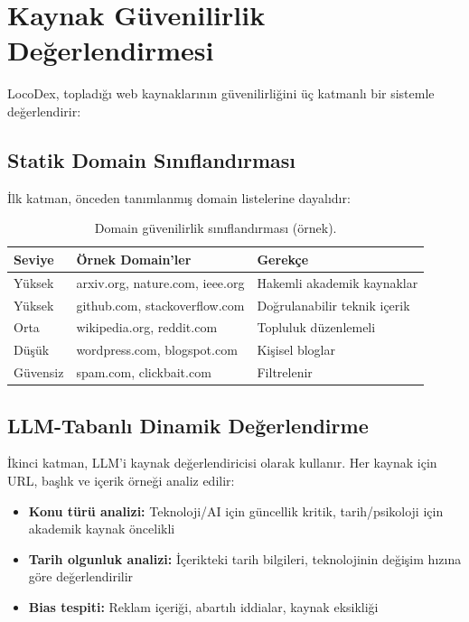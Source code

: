 \section{Kaynak G\"{u}venilirlik De\u{g}erlendirmesi}
\label{sec:source-reliability}

LocoDex, toplad{\i}\u{g}{\i} web kaynaklar{\i}n{\i}n g\"{u}venilirli\u{g}ini \"{u}\c{c} katmanl{\i} bir sistemle de\u{g}erlendirir:

\subsection{Statik Domain S{\i}n{\i}fland{\i}rmas{\i}}

\.{I}lk katman, \"{o}nceden tan{\i}mlanm{\i}\c{s} domain listelerine dayal{\i}d{\i}r:

\begin{table}[H]
\centering
\caption{Domain g\"{u}venilirlik s{\i}n{\i}fland{\i}rmas{\i} (\"{o}rnek).}
\label{tab:domain-reliability}
\begin{tabular}{lll}
\toprule
\textbf{Seviye} & \textbf{\"{O}rnek Domain'ler} & \textbf{Gerek\c{c}e} \\
\midrule
Y\"{u}ksek & arxiv.org, nature.com, ieee.org & Hakemli akademik kaynaklar \\
Y\"{u}ksek & github.com, stackoverflow.com & Do\u{g}rulanabilir teknik i\c{c}erik \\
Orta & wikipedia.org, reddit.com & Topluluk d\"{u}zenlemeli \\
D\"{u}\c{s}\"{u}k & wordpress.com, blogspot.com & Ki\c{s}isel bloglar \\
G\"{u}vensiz & spam.com, clickbait.com & Filtrelenir \\
\bottomrule
\end{tabular}
\end{table}

\subsection{LLM-Tabanl{\i} Dinamik De\u{g}erlendirme}

\.{I}kinci katman, LLM'i kaynak de\u{g}erlendiricisi olarak kullan{\i}r. Her kaynak i\c{c}in URL, ba\c{s}l{\i}k ve i\c{c}erik \"{o}rne\u{g}i analiz edilir:

\begin{itemize}
  \item \textbf{Konu t\"{u}r\"{u} analizi:} Teknoloji/AI i\c{c}in g\"{u}ncellik kritik, tarih/psikoloji i\c{c}in akademik kaynak \"{o}ncelikli
  \item \textbf{Tarih olgunluk analizi:} \.{I}\c{c}erikteki tarih bilgileri, teknolojinin de\u{g}i\c{s}im h{\i}z{\i}na g\"{o}re de\u{g}erlendirilir
  \item \textbf{Bias tespiti:} Reklam i\c{c}eri\u{g}i, abart{\i}l{\i} iddialar, kaynak eksikli\u{g}i
\end{itemize}

